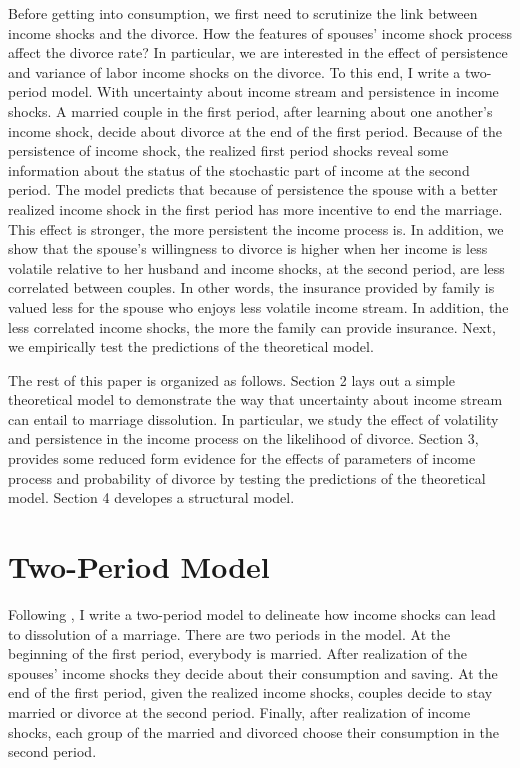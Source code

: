 Before getting into consumption, we first need to scrutinize the link between income shocks and the divorce. How the features of spouses' income shock process affect the divorce rate? In particular, we are interested in the effect of persistence and variance of labor income shocks on the divorce. To this end, I write a two-period model. With uncertainty about income stream and persistence in income shocks. A married couple in the first period, after learning about one another's income shock, decide about divorce at the end of the first period. Because of the persistence of income shock, the realized first period shocks reveal some information about the status of the stochastic part of income at the second period. The model predicts that because of persistence the spouse with a better realized income shock in the first period has more incentive to end the marriage. This effect is stronger, the more persistent the income process is. In addition, we show that the spouse's willingness to divorce is higher when her income is less volatile relative to her husband and income shocks, at the second period, are less correlated between couples. In other words, the insurance provided by family is valued less for the spouse who enjoys less volatile income stream. In addition, the less correlated income shocks, the more the family can provide insurance. Next, we empirically test the predictions of the theoretical model. 

The rest of this paper is organized as follows. Section 2 lays out a simple theoretical model to demonstrate the way that uncertainty about income stream can entail to marriage dissolution. In particular, we study the effect of volatility and persistence in the income process on the likelihood of divorce. Section 3, provides some reduced form evidence for the effects of parameters of income process and probability of divorce by testing the predictions of the theoretical model. Section 4 developes a structural model.  \\   
 
 
\section{Two-Period Model} 

Following \citet{Hess_2004}, I write a two-period model to delineate how income shocks can lead to dissolution of a marriage. There are two periods in the model. At the beginning of the first period, everybody is married. After realization of the spouses' income shocks they decide about their consumption and saving. At the end of the first period, given the realized income shocks, couples decide to stay married or divorce at the second period. Finally, after realization of income shocks, each group of the married and divorced choose their consumption in the second period. 

